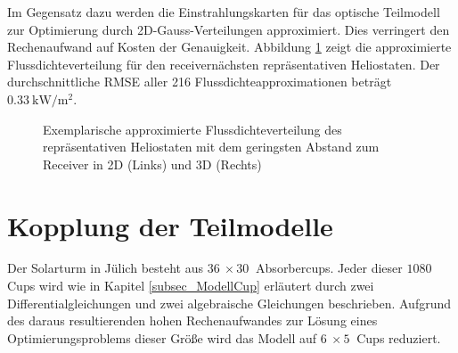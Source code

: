Im Gegensatz dazu werden die Einstrahlungskarten für das optische Teilmodell zur Optimierung durch 2D-Gauss-Verteilungen approximiert.
Dies verringert den Rechenaufwand auf Kosten der Genauigkeit.
Abbildung \ref{fig_GaussFluxmap} zeigt die approximierte Flussdichteverteilung für den receivernächsten repräsentativen Heliostaten.
Der durchschnittliche RMSE aller 216 Flussdichteapproximationen beträgt $\SI{0.33}{\kilo\watt\per\metre\squared}$.

\begin{figure}[h!]
    \centering
    \setlength{\fboxsep}{1pt}
    \setlength{\fboxrule}{1pt}
    \caption[Exemplarische approximierte Flussdichteverteilung des repräsentativen Heliostaten mit dem geringsten Abstand zum Receiver in 2D und 3D]{Exemplarische approximierte Flussdichteverteilung des repräsentativen Heliostaten mit dem geringsten Abstand zum Receiver in 2D (Links) und 3D (Rechts)}
    \label{fig_GaussFluxmap}
\end{figure}

\pagebreak
\section{Kopplung der Teilmodelle} \label{sec_KopplungModelle}
Der Solarturm in Jülich besteht aus $\SI{36}{} \times \SI{30}{}$ Absorbercups.
Jeder dieser $1080$ Cups wird wie in Kapitel \ref{subsec_ModellCup} erläutert durch zwei Differentialgleichungen und zwei algebraische Gleichungen beschrieben.
Aufgrund des daraus resultierenden hohen Rechenaufwandes zur Lösung eines Optimierungsproblems dieser Größe wird das Modell auf $\SI{6}{} \times \SI{5}{}$ Cups reduziert.

